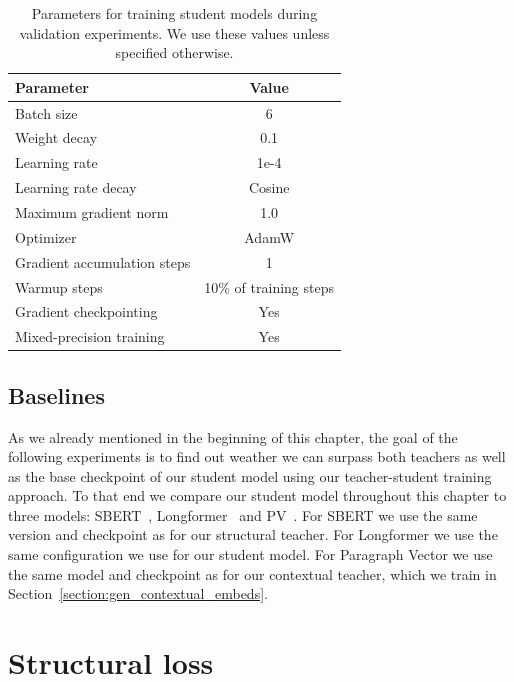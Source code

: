 \begin{table}
  \centering
  \begin{tabular}{l c}
    \toprule
    Parameter & Value \\
    \midrule
    Batch size & 6 \\
    Weight decay & 0.1 \\
    Learning rate & 1e-4 \\
    Learning rate decay & Cosine \\
    Maximum gradient norm & 1.0 \\
    Optimizer & AdamW \\
    Gradient accumulation steps & 1 \\
    Warmup steps & 10\% of training steps \\
    Gradient checkpointing & Yes \\
    Mixed-precision training & Yes \\
    \bottomrule
  \end{tabular}

  \caption{Parameters for training student models during validation experiments.
    We use these values unless specified otherwise.}

  \label{table:student_train_params}

\end{table}

\subsection{Baselines}

As we already mentioned in the beginning of this chapter, the goal of the
following experiments is to find out weather we can surpass both teachers as
well as the base checkpoint of our student model using our teacher-student
training approach. To that end we compare our student model throughout this
chapter to three models: SBERT~\citep{reimers2019sentence},
Longformer~\citep{beltagy2020longformer} and PV~\citep{le2014distributed}. For
SBERT we use the same version and checkpoint as for our structural teacher. For
Longformer we use the same configuration we use for our student model. For
Paragraph Vector we use the same model and checkpoint as for our contextual
teacher, which we train in Section~\ref{section:gen_contextual_embeds}.

\section{Structural loss}\label{section:structural_loss}

